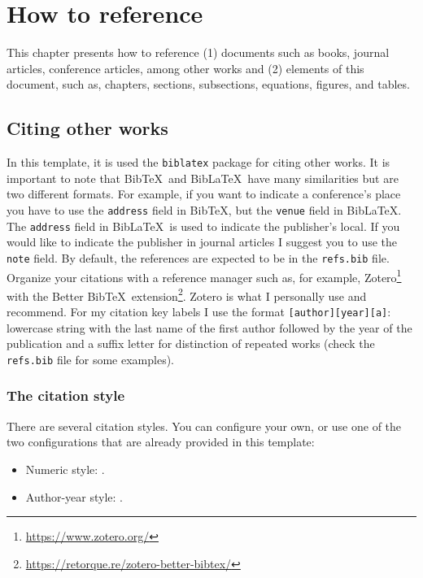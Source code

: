 \chapter{How to reference}
\label{ch:how-to-reference}

This chapter presents how to reference (1) documents such as books, journal articles, conference articles, among other works and (2) elements of this document, such as, chapters, sections, subsections, equations, figures, and tables.

\section{Citing other works}
\label{sec:citing-other-works}

In this template, it is used the \verb+biblatex+ package for citing other works. It is important to note that Bib\TeX\ and Bib\LaTeX\ have many similarities but are two different formats. For example, if you want to indicate a conference's place you have to use the \verb+address+ field in Bib\TeX, but the \verb+venue+ field in Bib\LaTeX. The \verb+address+ field in Bib\LaTeX\ is used to indicate the publisher's local. If you would like to indicate the publisher in journal articles I suggest you to use the \verb+note+ field. By default, the references are expected to be in the \verb+refs.bib+ file. Organize your citations with a reference manager such as, for example, Zotero\footnote{\url{https://www.zotero.org/}} with the Better Bib\TeX\ extension\footnote{\url{https://retorque.re/zotero-better-bibtex/}}. Zotero is what I personally use and recommend. For my citation key labels I use the format \texttt{[author][year][a]}: lowercase string with the last name of the first author followed by the year of the publication and a suffix letter for distinction of repeated works (check the \texttt{refs.bib} file for some examples).

\subsection{The citation style}
\label{ssec:the-citation-style}

There are several citation styles. You can configure your own, or use one of the two configurations that are already provided in this template:

\begin{itemize}
\item
Numeric style: \verb++.
\item
Author-year style: \verb++.
\end{itemize}

